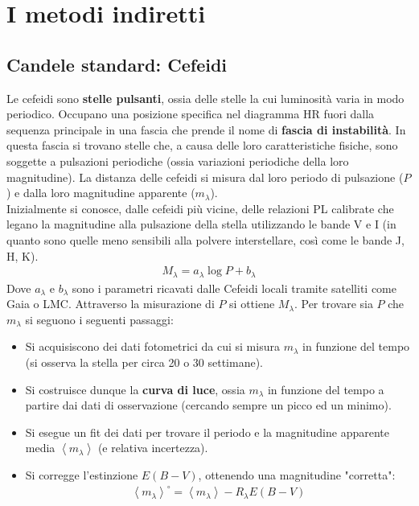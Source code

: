 \documentclass[a4paper, oneside]{book}
\begin{document}
\section{I metodi indiretti}
\subsection{Candele standard: Cefeidi}
Le cefeidi sono \textbf{stelle pulsanti}, ossia delle stelle la cui luminosità varia in modo periodico. 
Occupano una posizione specifica nel diagramma HR fuori dalla sequenza principale in una fascia che
prende il nome di \textbf{fascia di instabilità}. In questa fascia si trovano stelle 
che, a causa delle loro caratteristiche fisiche, sono soggette a pulsazioni periodiche (ossia 
variazioni periodiche della loro magnitudine). La distanza delle cefeidi si misura dal loro periodo di pulsazione ($P$) e 
dalla loro magnitudine apparente ($m_\lambda$). \\ \noindent
Inizialmente si conosce, dalle cefeidi più vicine, delle relazioni  PL calibrate che legano la magnitudine 
alla pulsazione della stella utilizzando le bande V e I (in quanto sono quelle meno 
sensibili alla polvere interstellare, così come le bande J, H, K). 
\begin{gather*}
    M_\lambda = a_\lambda \log P + b_\lambda
\end{gather*}
Dove $a_\lambda$ e $b_\lambda$ sono i parametri ricavati dalle Cefeidi locali tramite 
satelliti come Gaia o LMC. Attraverso la misurazione di $P$ si ottiene $M_\lambda$. Per
trovare sia $P$ che $m_\lambda$ si seguono i seguenti passaggi:
\begin{itemize}
    \item  Si acquisiscono dei dati fotometrici da cui si misura $m_\lambda$ in 
    funzione del tempo (si osserva la stella per circa 20 o 30 settimane).
    \item Si costruisce dunque la \textbf{curva di luce}, ossia $m_\lambda$ in funzione
    del tempo a partire dai dati di osservazione (cercando sempre un picco ed un minimo).
    \item Si esegue un fit dei dati per trovare il periodo e la magnitudine apparente media
    $\left< m_\lambda \right>$ (e relativa incertezza). 
    \item Si corregge l'estinzione $E(B - V)$, ottenendo una magnitudine "corretta":
    \begin{gather*}
        \left< m_\lambda\right>^{\circ}  = \left< m_\lambda \right> - R_\lambda E(B - V)
    \end{gather*}
\end{itemize} 
\end{document}
